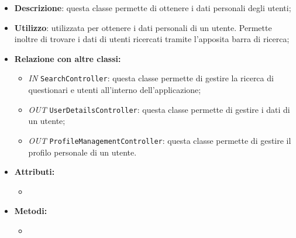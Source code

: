 \begin{itemize}
	\item \textbf{Descrizione}: questa classe permette di ottenere i dati personali degli utenti;
	\item \textbf{Utilizzo}: utilizzata per ottenere i dati personali di un utente. Permette inoltre di trovare i dati di utenti ricercati tramite l'apposita barra di ricerca;
	\item \textbf{Relazione con altre classi:}
	\begin{itemize}
		\item \textit{IN} \texttt{SearchController}: questa classe permette di gestire la ricerca di questionari e utenti all'interno dell'applicazione;
		\item \textit{OUT} \texttt{UserDetailsController}: questa classe permette di gestire i dati di un utente;
		\item \textit{OUT} \texttt{ProfileManagementController}: questa classe permette di gestire il profilo personale di un utente. 
	\end{itemize}
	\item \textbf{Attributi:}
	\begin{itemize}
		\item 
	\end{itemize}
	\item \textbf{Metodi:}
	\begin{itemize}
		\item 
	\end{itemize}
\end{itemize}
